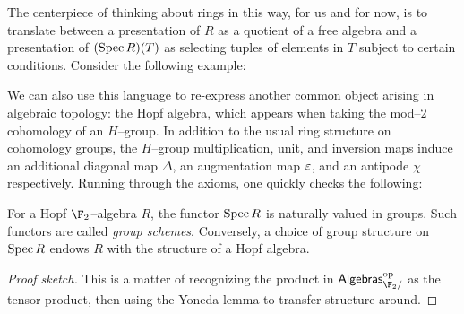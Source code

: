 The centerpiece of thinking about rings in this way, for us and for now, is to translate between a presentation of $R$ as a quotient of a free algebra and a presentation of $(\operatorname{Spec} R)(T)$ as selecting tuples of elements in $T$ subject to certain conditions.  Consider the following example:

We can also use this language to re-express another common object arising in algebraic topology: the Hopf algebra, which appears when taking the mod--$2$ cohomology of an $H$--group.  In addition to the usual ring structure on cohomology groups, the $H$--group multiplication, unit, and inversion maps induce an additional diagonal map $\Delta$, an augmentation map $\varepsilon$, and an antipode $\chi$ respectively.  Running through the axioms, one quickly checks the following:
\begin{lemma}
For a Hopf $\F_2$--algebra $R$, the functor $\operatorname{Spec} R$ is naturally valued in groups.  Such functors are called \textit{group schemes}.  Conversely, a choice of group structure on $\operatorname{Spec} R$ endows $R$ with the structure of a Hopf algebra.
\end{lemma}
\begin{proof}[Proof sketch]
This is a matter of recognizing the product in $\CatOf{Algebras}_{\F_2/}^{\mathrm{op}}$ as the tensor product, then using the Yoneda lemma to transfer structure around.
\end{proof}

